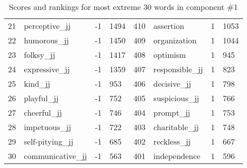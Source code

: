 \begin{table}[tbp]
\begin{tabular}{| rlr@{.}l | rlr@{.}l |}
    21 & perceptive\_jj & -1 & 1494    &    410 & assertion & 1 & 1053 \\
    22 & humorous\_jj & -1 & 1450    &    409 & organization & 1 & 1044 \\
    23 & folksy\_jj & -1 & 1417    &    408 & optimism & 1 & 945 \\
    24 & expressive\_jj & -1 & 1359    &    407 & responsible\_jj & 1 & 823 \\
    25 & kind\_jj & -1 & 953    &    406 & decisive\_jj & 1 & 798 \\
    26 & playful\_jj & -1 & 752    &    405 & suspicious\_jj & 1 & 766 \\
    27 & cheerful\_jj & -1 & 746    &    404 & prompt\_jj & 1 & 753 \\
    28 & impetuous\_jj & -1 & 722    &    403 & charitable\_jj & 1 & 748 \\
    29 & self-pitying\_jj & -1 & 685    &    402 & reckless\_jj & 1 & 667 \\
    30 & communicative\_jj & -1 & 563    &    401 & independence & 1 & 596 \\
    \hline
    \end{tabular}
    \caption{Scores and rankings for most extreme 30 words in component \#1} 
\end{table}
\clearpage
